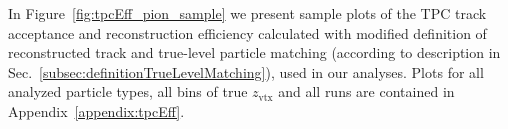 In Figure~\ref{fig:tpcEff_pion_sample} we present sample plots of the TPC track acceptance and reconstruction efficiency calculated with modified definition of reconstructed track and true-level particle matching (according to description in Sec.~\ref{subsec:definitionTrueLevelMatching}), used in our analyses. Plots for all analyzed particle types, all bins of true $z_{\text{vtx}}$ and all runs are contained in Appendix~\ref{appendix:tpcEff}.

\begin{figure}[h!]
	\centering
	\parbox{0.485\textwidth}{
		\centering
		\begin{subfigure}[b]{\linewidth}
		\end{subfigure}\\[5pt]
		\begin{subfigure}[b]{\linewidth}\addtocounter{subfigure}{1}

\end{subfigure}}
\end{figure}
